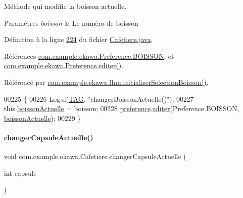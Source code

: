 Méthode qui modifie la boisson actuelle. 


\begin{DoxyParams}{Paramètres}
{\em boisson} & Le numéro de boisson \\
\hline
\end{DoxyParams}


Définition à la ligne \hyperlink{_cafetiere_8java_source_l00224}{224} du fichier \hyperlink{_cafetiere_8java_source}{Cafetiere.\+java}.



Références \hyperlink{_preference_8java_source_l00032}{com.\+example.\+ekawa.\+Preference.\+B\+O\+I\+S\+S\+ON}, et \hyperlink{_preference_8java_source_l00100}{com.\+example.\+ekawa.\+Preference.\+editer()}.



Référencé par \hyperlink{_ihm_8java_source_l00470}{com.\+example.\+ekawa.\+Ihm.\+initialiser\+Selection\+Boisson()}.


\begin{DoxyCode}
00225     \{
00226         Log.d(\hyperlink{classcom_1_1example_1_1ekawa_1_1_cafetiere_aa0c1fd99a2508b06c462aea17034aa91}{TAG}, \textcolor{stringliteral}{"changerBoissonActuelle()"});
00227         this.\hyperlink{classcom_1_1example_1_1ekawa_1_1_cafetiere_a73c5fa3b510655e1e3425140336b7f5b}{boissonActuelle} = boisson;
00228         \hyperlink{classcom_1_1example_1_1ekawa_1_1_cafetiere_aee3f9b78df63bc8dd73bf564954d51ca}{preference}.\hyperlink{classcom_1_1example_1_1ekawa_1_1_preference_a5af7a0595acfd41f1bd0b34ca0bfcb2a}{editer}(Preference.BOISSON, \hyperlink{classcom_1_1example_1_1ekawa_1_1_cafetiere_a73c5fa3b510655e1e3425140336b7f5b}{boissonActuelle});
00229     \}
\end{DoxyCode}
\mbox{\label{classcom_1_1example_1_1ekawa_1_1_cafetiere_a686b4e821ea9164323753eb123576921}} 
\paragraph{\texorpdfstring{changer\+Capsule\+Actuelle()}{changerCapsuleActuelle()}}
{\footnotesize\ttfamily void com.\+example.\+ekawa.\+Cafetiere.\+changer\+Capsule\+Actuelle (\begin{DoxyParamCaption}\item[{int}]{capsule }\end{DoxyParamCaption})}



